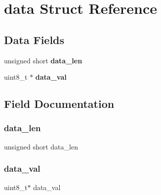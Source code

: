 \hypertarget{structdata}{}\section{data Struct Reference}
\label{structdata}
\subsection*{Data Fields}
\begin{DoxyCompactItemize}
\item
\hypertarget{structdata_a6f3d37631dba01e26032fe578e2f5d8d}{}\label{structdata_a6f3d37631dba01e26032fe578e2f5d8d}
unsigned short {\bfseries data\+\_\+len}
\item
\hypertarget{structdata_a2f4466e4bad9395ffd9a9c03b208d4eb}{}\label{structdata_a2f4466e4bad9395ffd9a9c03b208d4eb}
uint8\+\_\+t $\ast$ {\bfseries data\+\_\+val}
\end{DoxyCompactItemize}


\subsection{Field Documentation}
\hypertarget{structdata_a6f3d37631dba01e26032fe578e2f5d8d}{}\label{structdata_a6f3d37631dba01e26032fe578e2f5d8d}
\subsubsection{\texorpdfstring{data\+\_\+len}{data\_len}}
{\footnotesize\ttfamily unsigned short data\+\_\+len}

\hypertarget{structdata_a2f4466e4bad9395ffd9a9c03b208d4eb}{}\label{structdata_a2f4466e4bad9395ffd9a9c03b208d4eb}
\subsubsection{\texorpdfstring{data\+\_\+val}{data\_val}}
{\footnotesize\ttfamily uint8\+\_\+t$\ast$ data\+\_\+val}

